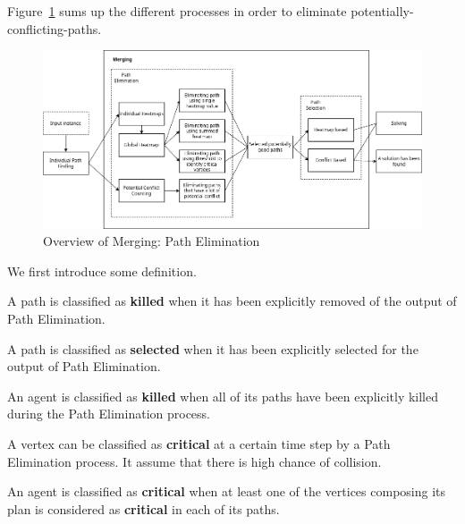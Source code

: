 Figure~\ref{fig:overview_merging_path_elemination} sums up the different processes in order to eliminate potentially-conflicting-paths.

\begin{figure}[H]
    \centering
    \caption{Overview of Merging: Path Elimination}\label{fig:overview_merging_path_elemination}
    \includegraphics[width=\widthimg]{img/overview_merging_path_elimination.drawio.png}
\end{figure}

We first introduce some definition.

\begin{definition}
    A path is classified as \textbf{killed} when it has been explicitly removed of the output of Path Elimination.
\end{definition}

\begin{definition}
    A path is classified as \textbf{selected} when it has been explicitly selected for the output of Path Elimination.
\end{definition}

\begin{definition}
    An agent is classified as \textbf{killed} when all of its paths have been explicitly killed during the Path Elimination process.
\end{definition}

\begin{definition}
    A vertex can be classified as \textbf{critical} at a certain time step by a Path Elimination process. It assume that there is high chance of collision.
\end{definition}

\begin{definition}
    An agent is classified as \textbf{critical} when at least one of the vertices composing its plan is considered as \textbf{critical} in each of its paths.
\end{definition}

